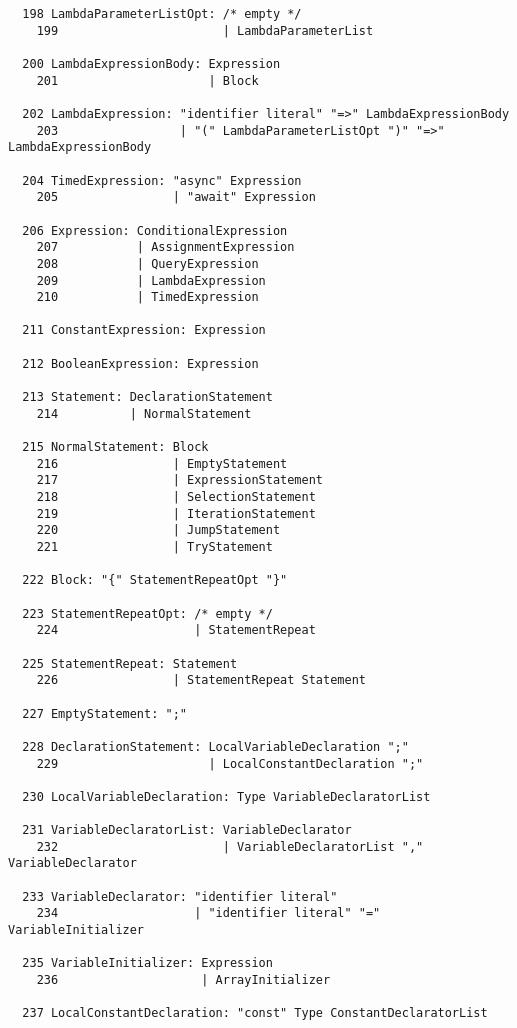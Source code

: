 \begin{espacosimples}
\begin{scriptsize}
\begin{lstlisting}
  198 LambdaParameterListOpt: /* empty */
    199                       | LambdaParameterList
  
  200 LambdaExpressionBody: Expression
    201                     | Block
  
  202 LambdaExpression: "identifier literal" "=>" LambdaExpressionBody
    203                 | "(" LambdaParameterListOpt ")" "=>" LambdaExpressionBody
  
  204 TimedExpression: "async" Expression
    205                | "await" Expression
  
  206 Expression: ConditionalExpression
    207           | AssignmentExpression
    208           | QueryExpression
    209           | LambdaExpression
    210           | TimedExpression
  
  211 ConstantExpression: Expression
  
  212 BooleanExpression: Expression
  
  213 Statement: DeclarationStatement
    214          | NormalStatement
  
  215 NormalStatement: Block
    216                | EmptyStatement
    217                | ExpressionStatement
    218                | SelectionStatement
    219                | IterationStatement
    220                | JumpStatement
    221                | TryStatement
  
  222 Block: "{" StatementRepeatOpt "}"
  
  223 StatementRepeatOpt: /* empty */
    224                   | StatementRepeat
  
  225 StatementRepeat: Statement
    226                | StatementRepeat Statement
  
  227 EmptyStatement: ";"
  
  228 DeclarationStatement: LocalVariableDeclaration ";"
    229                     | LocalConstantDeclaration ";"
  
  230 LocalVariableDeclaration: Type VariableDeclaratorList
  
  231 VariableDeclaratorList: VariableDeclarator
    232                       | VariableDeclaratorList "," VariableDeclarator
  
  233 VariableDeclarator: "identifier literal"
    234                   | "identifier literal" "=" VariableInitializer
  
  235 VariableInitializer: Expression
    236                    | ArrayInitializer
  
  237 LocalConstantDeclaration: "const" Type ConstantDeclaratorList
  

\end{lstlisting}
\end{scriptsize}
\end{espacosimples}
